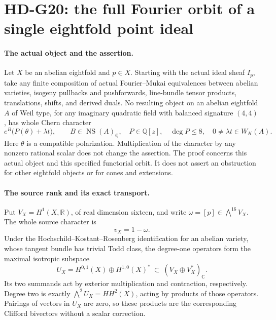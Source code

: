 \section{HD-G20: the full Fourier orbit of a single eightfold point ideal}
\label{sec:point-eightfold-full-spin}

\paragraph{The actual object and the assertion.}
Let \(X\) be an abelian eightfold and \(p\in X\). Starting with
the actual ideal sheaf \(I_p\), take any finite composition of actual
Fourier--Mukai equivalences between abelian varieties, isogeny pullbacks
and pushforwards, line-bundle tensor products, translations, shifts,
and derived duals. No resulting object on an abelian eightfold \(A\)
of Weil type, for any imaginary quadratic field with balanced signature
\((4,4)\), has whole Chern character
\begin{equation}\label{eq:G20-target}
 e^B\bigl(P(\theta)+\lambda t\bigr),\qquad
 B\in\operatorname{NS}(A)_{\mathbb Q},\quad
 P\in\mathbb Q[z],\quad\deg P\le8,\quad
 0\ne\lambda t\in W_K(A).
\end{equation}
Here \(\theta\) is a compatible polarization. Multiplication of the
character by any nonzero rational scalar does not change the assertion.
The proof concerns this actual object and this specified functorial
orbit. It does not assert an obstruction for other eightfold objects
or for cones and extensions.

\paragraph{The source rank and its exact transport.}
Put \(V_X=H^1(X,\mathbb R)\), of real dimension sixteen, and write
\(\omega=[p]\in\bigwedge^{16}V_X\). The whole source character is
\[
                         v_X=1-\omega.
\]
Under the Hochschild--Kostant--Rosenberg identification for an abelian
variety, whose tangent bundle has trivial Todd class, the degree-one
operators form the maximal isotropic subspace
\[
 U_X=H^{0,1}(X)\oplus H^{1,0}(X)^*
        \ \subset\ (V_X\oplus V_X^*)_{\mathbb C}.
\]
Its two summands act by exterior multiplication and contraction,
respectively. Degree two is exactly \(\bigwedge^2U_X=HH^2(X)\),
acting by products of those operators. Pairings of vectors in \(U_X\)
are zero, so these products are the corresponding Clifford bivectors
without a scalar correction.

